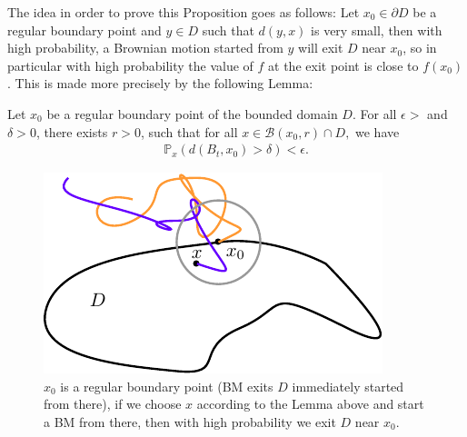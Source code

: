 \documentclass[../mainfile.tex]{subfiles}
\begin{document}
The idea in order to prove this Proposition goes as follows: Let $x_0 \in \partial D$ be a regular boundary point and $y \in D$ such that $d(y,x)$ is very small, then with high probability, a Brownian motion started from $y$ will exit $D$ near $x_0$, so in particular with high probability the value of $f$ at the exit point is close to $f(x_0)$. This is made more precisely by the following Lemma:
\begin{lem} Let $x_0$ be a regular boundary point of the bounded domain $D$. For all $\epsilon >$ and $\delta >0$, there exists $r>0$, such that for all $x \in \mathcal{B}(x_0,r) \cap D,$ we have 
\begin{align*}
\mathbb{P}_x(d(B_t,x_0) > \delta) < \epsilon. 
\end{align*}
\end{lem}
\begin{figure}[hbtp]
\centering
\includegraphics[scale=.8]{lemmaexittime.pdf}
\caption{$x_0$ is a regular boundary point (BM exits $D$ immediately started from there), if we choose $x$ according to the Lemma above and start a BM from there, then with high probability we exit $D$ near $x_0$.} 
\end{figure}
\newpage
\end{document}
